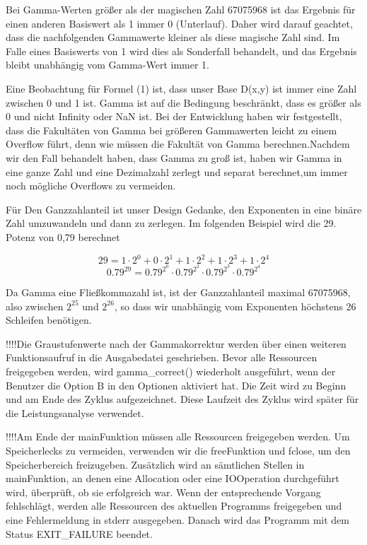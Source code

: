 \documentclass[course=erap]{aspdoc}
\begin{document}
\par
Bei Gamma-Werten größer als der magischen Zahl 67075968 ist das Ergebnis für einen anderen Basiswert als 1 immer 0 (Unterlauf). Daher wird darauf geachtet, dass die nachfolgenden Gammawerte kleiner als diese magische Zahl sind. Im Falle eines Basiswerts von 1 wird dies als Sonderfall behandelt, und das Ergebnis bleibt unabhängig vom Gamma-Wert immer 1.

\par
Eine Beobachtung für Formel (1) ist, dass unser Base D(x,y) ist immer eine Zahl zwischen 0 und 1 ist. Gamma ist auf die Bedingung beschränkt, dass es größer als 0 und nicht Infinity oder NaN ist. Bei der Entwicklung haben wir festgestellt, dass die Fakultäten von Gamma bei größeren Gammawerten leicht zu einem Overflow führt, denn wie müssen die Fakultät von Gamma berechnen.Nachdem wir den Fall behandelt haben, dass Gamma zu groß ist, haben wir Gamma in eine ganze Zahl und eine Dezimalzahl zerlegt und separat berechnet,um immer noch mögliche Overflows zu vermeiden.

\par
Für Den Ganzzahlanteil ist unser Design Gedanke, den Exponenten in eine binäre Zahl umzuwandeln und dann zu zerlegen. Im folgenden Beispiel wird die 29. Potenz von 0,79 berechnet

\[
29 = 1 \cdot 2^0 + 0 \cdot 2^1 + 1 \cdot 2^2 + 1 \cdot 2^3 + 1 \cdot 2^4
\]
\[
0.79^{29} = 0.79^{2^0} \cdot 0.79^{2^2} \cdot 0.79^{2^3} \cdot 0.79^{2^4}
\]

\par
Da Gamma eine Fließkommazahl ist, ist der Ganzzahlanteil maximal 67075968, also zwischen $2^{25}$ und $2^{26}$, so dass wir unabhängig vom Exponenten höchstens 26 Schleifen benötigen.

\par
!!!!Die Graustufenwerte nach der Gammakorrektur werden über einen weiteren Funktionsaufruf in die Ausgabedatei geschrieben. Bevor alle Ressourcen freigegeben werden, wird gamma\_correct() wiederholt ausgeführt, wenn der Benutzer die Option \-B in den Optionen aktiviert hat. Die Zeit wird zu Beginn und am Ende des Zyklus aufgezeichnet. Diese Laufzeit des Zyklus wird später für die Leistungsanalyse verwendet.

\par
!!!!Am Ende der main\-Funktion müssen alle Ressourcen freigegeben werden. Um Speicherlecks zu vermeiden, verwenden wir die free\-Funktion und fclose, um den Speicherbereich freizugeben. Zusätzlich wird an sämtlichen Stellen in main\-Funktion, an denen eine Allocation oder eine IO\-Operation durchgeführt wird, überprüft, ob sie erfolgreich war. Wenn der entsprechende Vorgang fehlschlägt, werden alle Ressourcen des aktuellen Programms freigegeben und eine Fehlermeldung in stderr ausgegeben. Danach wird das Programm mit dem Status EXIT\_FAILURE beendet.
\end{document}
